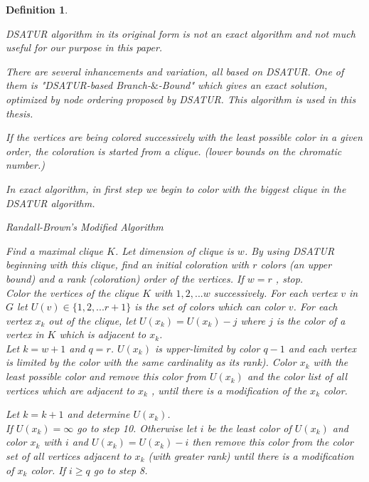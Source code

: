 \documentclass[12pt]{article}
\theoremstyle{slplain}
\newtheorem{defi}{Definition}
\begin{document}
\begin{defi}
\begin{algorithm}[H]
\end{algorithm}

\newpage

DSATUR algorithm in its original form is not an exact algorithm and not much useful for our purpose in this paper. 

There are several inhancements and variation, all based on DSATUR. One of them is "DSATUR-based Branch-$\&$-Bound" which gives an exact solution, optimized by node ordering proposed by DSATUR. This algorithm is used in this thesis.

If the vertices are being colored successively with the least possible color in a
given order, the coloration is started from a clique. (lower bounds on the 
chromatic number.)

In exact algorithm, in first step we begin to color with the biggest clique in the DSATUR algorithm.



\newpage
{}
\begin{algorithm}[H]
\SetAlgoLined
\DontPrintSemicolon
  \caption{Randall-Brown's Modified Algorithm\cite{randall}}
  
{\small  Find a maximal clique $K$. Let dimension of clique is $w$. By using DSATUR
beginning with this clique, find an initial coloration with $r$ colors (an
upper bound) and a rank (coloration) order of the vertices. If $w = r$ , stop.\\

 Color the vertices of the clique $K$ with $1, 2, . . . w$ successively. For each
vertex $v$ in $G$ let $U(v) \in \{1, 2, . . . r + 1\}$ is the set of colors which can color
$v$. For each vertex $x_k$ out of the clique, let $U(x_k) = U(x_k) - j$ where $j$ is
the color of a vertex in $K$ which is adjacent to $x_k$.\\

 Let $k = w + 1$ and $q = r$.\newline
$U(x_k)$ is upper-limited by color $q - 1$ and each vertex is limited by the color
with the same cardinality as its rank). Color $x_k$ with the least possible
color and remove this color from $U(x_k)$ and the color list of all vertices
which are adjacent to $x_k$ , until there is a modification of the $x_k$ color.

 Let $k = k + 1$ and determine $U(x_k)$.\\

 If $U(x_k) = \infty$ go to step 10. Otherwise let $i$ be the least color of $U(x_k)$ and
color $x_k$ with $i$ and $U(x_k) = U(x_k) - i$ then remove this color from the
color set of all vertices adjacent to $x_k$ (with greater rank) until there is a
modification of $x_k$ color. If $i \geq q$ go to step 8.\\

}
\end{algorithm}
\end{defi}
\end{document}
